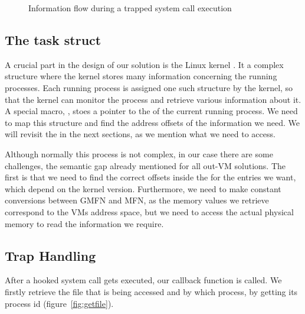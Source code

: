 \begin{figure}[ht]
	\centering
	
	\caption{Information flow during a trapped system call execution}
	\label{fig:overview}
\end{figure}


\subsection{The task struct}\label{sub:struct}
A crucial part in the design of our solution is the Linux kernel . It a complex structure where the kernel stores many information concerning the running processes. Each running process is assigned one such structure by the kernel, so that the kernel can monitor the process and retrieve various information about it. A special macro, , stoes a pointer to the  of the current running process. We need to map this structure and find the address offsets of the information we need. We will revisit the  in the next sections, as we mention what we need to access.

\par Although normally this process is not complex, in our case there are some challenges, the semantic gap already mentioned for all out-\ac{VM} solutions. The first is that we need to find the correct offsets inside the  for the entries we want, which depend on the kernel version. Furthermore, we need to make constant conversions between \ac{GMFN} and \ac{MFN}, as the memory values we retrieve correspond to the \ac{VM}s address space, but we need to access the actual physical memory to read the information we require.


\subsection{Trap Handling}\label{sub:handling}

After a hooked system call gets executed, our callback function is called. We firstly retrieve the file that is being accessed and by which process, by getting its process id (figure~\ref{fig:getfile}). 

